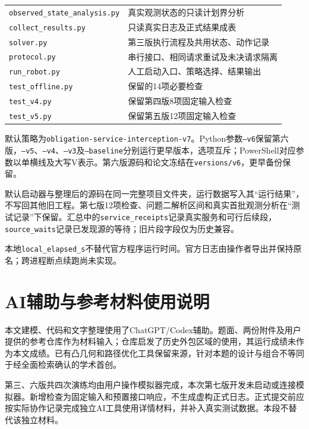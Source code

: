 \documentclass[UTF8,a4paper,zihao=-4,fontset=windows]{ctexart}
\begin{document}
\begin{longtable}{p{}p{}}
\texttt{observed\_\allowbreak{}state\_\allowbreak{}analysis.py}&真实观测状态的只读计划界分析\\
\texttt{collect\_results.py}&只读真实日志及正式结果成表\\
\texttt{solver.py}&第三版执行流程及共用状态、动作记录\\
\texttt{protocol.py}&串行接口、相同请求重试及未决请求隔离\\
\texttt{run\_robot.py}&人工启动入口、策略选择、结果输出\\
\texttt{test\_offline.py}&保留的14项必要检查\\
\texttt{test\_v4.py}&保留第四版8项固定输入检查\\
\texttt{test\_v5.py}&保留第五版12项固定输入检查\\\bottomrule
\end{longtable}


默认策略为\texttt{obligation-service-interception-v7}。Python参数\texttt{--v6}保留第六版，\texttt{--v5}、\texttt{--v4}、\texttt{--v3}及\texttt{--baseline}分别运行更早版本，选项互斥；PowerShell对应参数以单横线及大写V表示。第六版源码和论文冻结在\texttt{versions/v6}，更早备份保留。

默认启动器与整理后的源码在同一完整项目文件夹，运行数据写入其“运行结果”，不写回其他旧工程。第七版12项检查、问题二解析区间和真实首批观测分析在“测试记录”下保留。汇总中的\texttt{service\_receipts}记录真实服务和可行后续段，\texttt{source\_waits}记录已发现源的等待；旧片段字段仅为历史兼容。

本地\texttt{local\_elapsed\_s}不替代官方程序运行时间。官方日志由操作者导出并保持原名；跨进程断点续跑尚未实现。

\section{AI辅助与参考材料使用说明}
本文建模、代码和文字整理使用了ChatGPT/Codex辅助。题面、两份附件及用户提供的参考仓库作为材料输入；仓库启发了历史外包区域的使用，其运行成绩未作为本文成绩。已有凸几何和路径优化工具保留来源，针对本题的设计与组合不等同于经全面检索确认的学术首创。

第三、六版共四次演练均由用户操作模拟器完成，本次第七版开发未启动或连接模拟器。新增检查为固定输入和预置接口响应，不生成虚构正式日志。正式提交前应按实际协作记录完成独立AI工具使用详情材料，并补入真实测试数据。本段不替代该独立材料。
\end{document}
